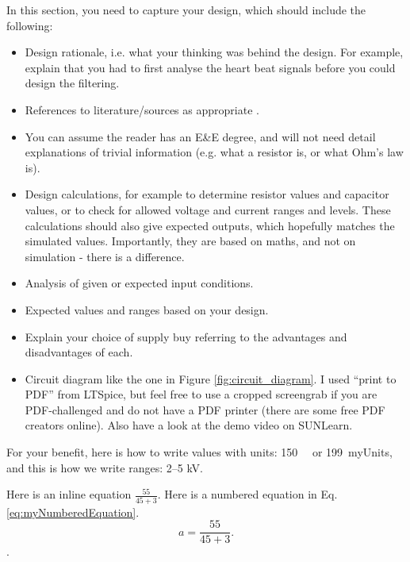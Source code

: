 In this section, you need to capture your design, which should include the following: 
\begin{itemize}
  \item Design rationale, i.e. what your thinking was behind the design. For example, explain that you had to first analyse the heart beat signals before you could design the filtering. 
  \item References to literature/sources as appropriate \cite{WebsiteOpAmp}.  
  \item You can assume the reader has an E\&E degree, and will not need detail explanations of trivial information (e.g. what a resistor is, or what Ohm's law is).  
  \item Design calculations, for example to determine resistor values and capacitor values, or to check for allowed voltage and current ranges and levels. These calculations should also give expected outputs, which hopefully matches the simulated values. Importantly, they are based on maths, and not on simulation - there is a difference. 
  \item Analysis of given or expected input conditions. 
  \item Expected values and ranges based on your design. 
  \item Explain your choice of supply buy referring to the advantages and disadvantages of each. 
  \item Circuit diagram like the one in Figure \ref{fig:circuit_diagram}. I used ``print to PDF'' from LTSpice,  but feel free to use a cropped screengrab if you are PDF-challenged and do not have a PDF printer (there are some free PDF creators online). Also have a look at the demo video on SUNLearn. 
\end{itemize}

For your benefit, here is how to write values with units: \SI{150}{\milli\Omega} or \SI{199}{myUnits}, and this is how we write ranges: \numrange{2}{5} \si{\kilo\volt}.

Here is an inline equation $ \frac{55}{45+3}$. Here is a numbered equation in Eq. \ref{eq:myNumberedEquation}.
\begin{equation}
   a = \frac{55}{45+3}
   \label{eq:myNumberedEquation}. 
\end{equation}. 

